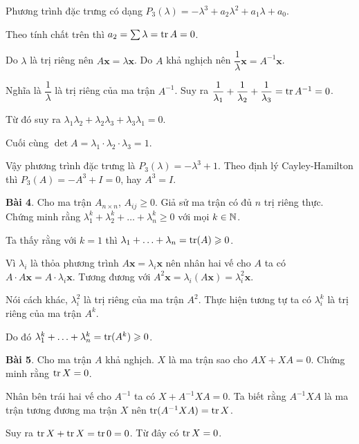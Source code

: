 Phương trình đặc trưng có dạng $P_3(\lambda) = -\lambda^3 + a_2 \lambda^2 + a_1 \lambda + a_0$.

Theo tính chất trên thì $a_2 = \sum \lambda = \operatorname{tr} A = 0$.

Do $\lambda$ là trị riêng nên $A \bm{x} = \lambda \bm{x}$. Do $A$ khả nghịch nên $\dfrac{1}{\lambda} \bm{x} = A^{-1} \bm{x}$.

Nghĩa là $\dfrac{1}{\lambda}$ là trị riêng của ma trận $A^{-1}$. Suy ra $\dfrac{1}{\lambda_1} + \dfrac{1}{\lambda_2} + \dfrac{1}{\lambda_3} = \operatorname{tr} A^{-1} = 0$.

Từ đó suy ra $\lambda_1 \lambda_2 + \lambda_2 \lambda_3 + \lambda_3 \lambda_1 = 0$.

Cuối cùng $\det A = \lambda_1 \cdot \lambda_2 \cdot \lambda_3 = 1$.

Vậy phương trình đặc trưng là $P_3(\lambda) = -\lambda^3 + 1$. Theo định lý Cayley-Hamilton thì $P_3(A) = -A^3 + I = 0$, hay $A^3 = I$.

\textbf{Bài 4}. Cho ma trận $A_{n \times n}$, $A_{ij} \geqslant 0$. Giả sử ma trận có đủ $n$ trị riêng thực. Chứng minh rằng $\lambda_1^k + \lambda_2^k + \ldots + \lambda_n^k \geqslant 0$ với mọi $k \in \mathbb{N}$.

Ta thấy rằng với $k=1$ thì $\lambda_1 + \ldots + \lambda_n = \operatorname{tr}(A) \geqslant 0$.

Vì $\lambda_i$ là thỏa phương trình $A \bm{x} = \lambda_i \bm{x}$ nên nhân hai vế cho $A$ ta có $A \cdot A \bm{x} = A \cdot \lambda_i \bm{x}$. Tương đương với $A^2 \bm{x} = \lambda_i (A \bm{x}) = \lambda_i^2 \bm{x}$.

Nói cách khác, $\lambda_i^2$ là trị riêng của ma trận $A^2$. Thực hiện tương tự ta có $\lambda_i^k$ là trị riêng của ma trận $A^k$.

Do đó $\lambda_1^k + \ldots + \lambda_n^k = \operatorname{tr}(A^k) \geqslant 0$.

\textbf{Bài 5}. Cho ma trận $A$ khả nghịch. $X$ là ma trận sao cho $AX + XA = 0$. Chứng minh rằng $\operatorname{tr} X = 0$.

Nhân bên trái hai vế cho $A^{-1}$ ta có $X + A^{-1} X A = 0$. Ta biết rằng $A^{-1} X A$ là ma trận tương đương ma trận $X$ nên $\operatorname{tr} (A^{-1} X A) = \operatorname{tr} X$.

Suy ra $\operatorname{tr} X + \operatorname{tr} X = \operatorname{tr} 0 = 0$. Từ đây có $\operatorname{tr} X = 0$.